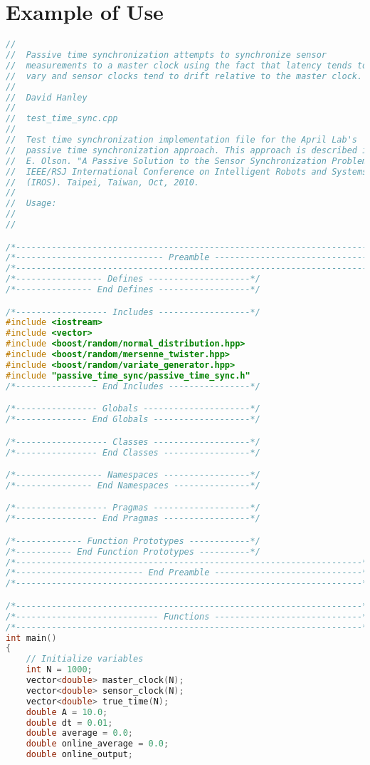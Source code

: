 \documentclass[11pt,a4paper]{article}
\begin{document}
\section{Example of Use}
\small
\begin{lstlisting}[language=C++]
//
//  Passive time synchronization attempts to synchronize sensor 
//  measurements to a master clock using the fact that latency tends to   
//  vary and sensor clocks tend to drift relative to the master clock. 
//
//  David Hanley
//
//  test_time_sync.cpp 
//
//  Test time synchronization implementation file for the April Lab's 
//  passive time synchronization approach. This approach is described in:
//  E. Olson. "A Passive Solution to the Sensor Synchronization Problem." 
//  IEEE/RSJ International Conference on Intelligent Robots and Systems  
//  (IROS). Taipei, Taiwan, Oct, 2010. 
//
//  Usage:
//  
//

/*---------------------------------------------------------------------*/
/*----------------------------- Preamble ------------------------------*/
/*---------------------------------------------------------------------*/
/*----------------- Defines --------------------*/
/*--------------- End Defines ------------------*/

/*------------------ Includes ------------------*/
#include <iostream>
#include <vector>
#include <boost/random/normal_distribution.hpp>
#include <boost/random/mersenne_twister.hpp>
#include <boost/random/variate_generator.hpp>
#include "passive_time_sync/passive_time_sync.h"
/*---------------- End Includes ----------------*/

/*---------------- Globals ---------------------*/
/*-------------- End Globals -------------------*/

/*------------------ Classes -------------------*/
/*---------------- End Classes -----------------*/

/*----------------- Namespaces -----------------*/
/*--------------- End Namespaces ---------------*/

/*------------------ Pragmas -------------------*/
/*---------------- End Pragmas -----------------*/

/*------------- Function Prototypes ------------*/
/*----------- End Function Prototypes ----------*/
/*--------------------------------------------------------------------*/
/*------------------------- End Preamble -----------------------------*/
/*--------------------------------------------------------------------*/

/*--------------------------------------------------------------------*/
/*---------------------------- Functions -----------------------------*/
/*--------------------------------------------------------------------*/
int main()
{
    // Initialize variables
    int N = 1000;
    vector<double> master_clock(N);
    vector<double> sensor_clock(N);
    vector<double> true_time(N);
    double A = 10.0;
    double dt = 0.01;
    double average = 0.0;
    double online_average = 0.0;
    double online_output;


\end{lstlisting}
\end{document}
